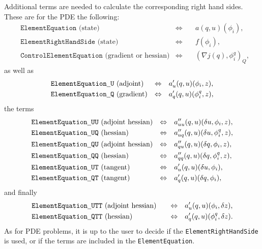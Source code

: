 Additional terms are needed to calculate the corresponding 
right hand sides. These are for the PDE the following: 
{\color{red}
\begin{align*}
&\texttt{ElementEquation}\text{ (state)} &\Leftrightarrow &\quad a(q,u)(\phi_i), \\
&\texttt{ElementRightHandSide}\text{ (state)}  &\Leftrightarrow &\quad f(\phi_i), \\
&\texttt{ControlElementEquation}\text{ (gradient or hessian)}  &\Leftrightarrow &\quad (\nabla j(q),\phi^q_i)_Q,
\end{align*}
as well as 
\begin{align*}
&\texttt{ElementEquation\underline{ }U}\text{ (adjoint)} 
&\Leftrightarrow &\quad a_u'(q,u)(\phi_i, z),\\
&\texttt{ElementEquation\underline{ }Q}\text{ (gradient)} 
&\Leftrightarrow &\quad a_q'(q,u)(\phi^q_i,z), \\
\end{align*}
the terms
\begin{align*}
&\texttt{ElementEquation\underline{ }UU}\text{ (adjoint hessian)}  
&\Leftrightarrow &\quad a_{uu}''(q,u)(\delta u, \phi_i, z),\\
&\texttt{ElementEquation\underline{ }UQ}\text{ (hessian)}
&\Leftrightarrow &\quad a_{uq}''(q,u)(\delta u, \phi^q_i, z),\\
&\texttt{ElementEquation\underline{ }QU}\text{ (adjoint hessian)} 
&\Leftrightarrow &\quad a_{qu}''(q,u)(\delta q, \phi_i, z), \\
&\texttt{ElementEquation\underline{ }QQ}\text{ (hessian)} 
&\Leftrightarrow &\quad a_{qq}''(q,u)(\delta q, \phi^q_i, z),\\
&\texttt{ElementEquation\underline{ }UT}\text{ (tangent)}  
&\Leftrightarrow &\quad a_u'(q,u)(\delta u, \phi_i), \\
&\texttt{ElementEquation\underline{ }QT}\text{ (tangent)}  
&\Leftrightarrow &\quad a_q'(q,u)(\delta q, \phi_i),
\end{align*}
and finally
\begin{align*}
&\texttt{ElementEquation\underline{ }UTT}\text{ (adjoint hessian)} \quad 
&\Leftrightarrow &\quad  a_u'(q,u)(\phi_i, \delta z), \\
&\texttt{ElementEquation\underline{ }QTT}\text{ (hessian)} \quad 
&\Leftrightarrow &\quad a_{q}'(q,u)(\phi^q_i,\delta z).
\end{align*}}
As for PDE problems, it is up to the user to decide if the \texttt{ElementRightHandSide}
is used, or if the terms are included in the \texttt{ElementEquation}. 


